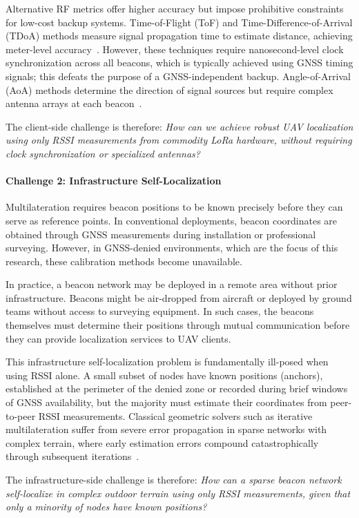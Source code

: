 \documentclass[master,final,11pt]{iscs-thesis}
\begin{document}
Alternative RF metrics offer higher accuracy but impose prohibitive constraints for low-cost backup systems.
Time-of-Flight (ToF) and Time-Difference-of-Arrival (TDoA) methods measure signal propagation time to estimate distance, achieving meter-level accuracy~\cite{pospisil2020tdoa}.
However, these techniques require nanosecond-level clock synchronization across all beacons, which is typically achieved using GNSS timing signals; this defeats the purpose of a GNSS-independent backup.
Angle-of-Arrival (AoA) methods determine the direction of signal sources but require complex antenna arrays at each beacon~\cite{ref_aoa_lora}.

The client-side challenge is therefore: \textit{How can we achieve robust UAV localization using only RSSI measurements from commodity LoRa hardware, without requiring clock synchronization or specialized antennas?}

\paragraph{Challenge 2: Infrastructure Self-Localization}
Multilateration requires beacon positions to be known precisely before they can serve as reference points.
In conventional deployments, beacon coordinates are obtained through GNSS measurements during installation or professional surveying.
However, in GNSS-denied environments, which are the focus of this research, these calibration methods become unavailable.

In practice, a beacon network may be deployed in a remote area without prior infrastructure.
Beacons might be air-dropped from aircraft or deployed by ground teams without access to surveying equipment.
In such cases, the beacons themselves must determine their positions through mutual communication before they can provide localization services to UAV clients.

This infrastructure self-localization problem is fundamentally ill-posed when using RSSI alone.
A small subset of nodes have known positions (anchors), established at the perimeter of the denied zone or recorded during brief windows of GNSS availability, but the majority must estimate their coordinates from peer-to-peer RSSI measurements.
Classical geometric solvers such as iterative multilateration suffer from severe error propagation in sparse networks with complex terrain, where early estimation errors compound catastrophically through subsequent iterations~\cite{hada2025hybrid}.

The infrastructure-side challenge is therefore: \textit{How can a sparse beacon network self-localize in complex outdoor terrain using only RSSI measurements, given that only a minority of nodes have known positions?}
\end{document}
